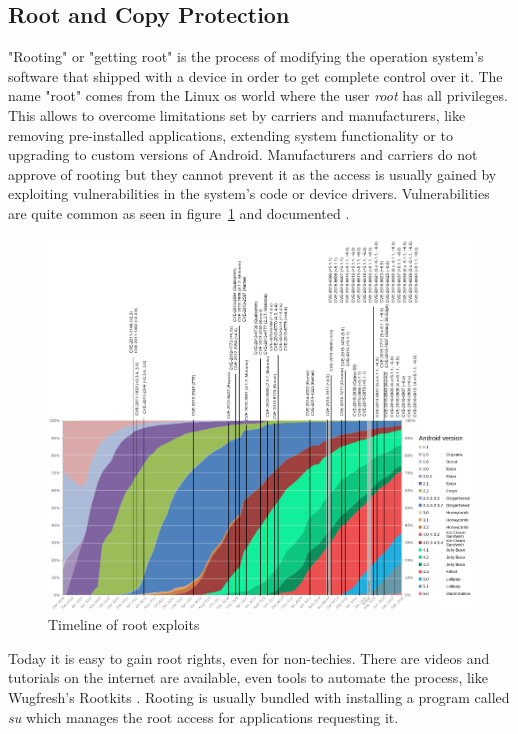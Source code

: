 \subsection{Root and Copy Protection} \label{subsection:android-copyroot}
"Rooting" or "getting root" is the process of modifying the operation system's software that shipped with a device in order to get complete control over it.
The name "root" comes from the Linux \gls{os} world where the user \textit{root} has all privileges.
This allows to overcome limitations set by carriers and manufacturers, like removing pre-installed applications, extending system functionality or to upgrading to custom versions of Android.
Manufacturers and carriers do not approve of rooting but they cannot prevent it as the access is usually gained by exploiting vulnerabilities in the system's code or device drivers.
Vulnerabilities are quite common as seen in figure~\ref{fig:root} and documented \cite{cveAndroidPriv}.
\begin{figure}[h]
    \centering
    \includegraphics[width=1\textwidth]{data/timeline.png}
    \caption{Timeline of root exploits \cite{distributionRoot} \cite{androidVulnerabilities} \cite{cveAndroidPriv}}
    \label{fig:root}
\end{figure}
Today it is easy to gain root rights, even for non-techies.
There are videos and tutorials on the internet are available, even tools to automate the process, like Wugfresh's Rootkits \cite{wugfresh}.
Rooting is usually bundled with installing a program called \textit{su} which manages the root access for applications requesting it.

